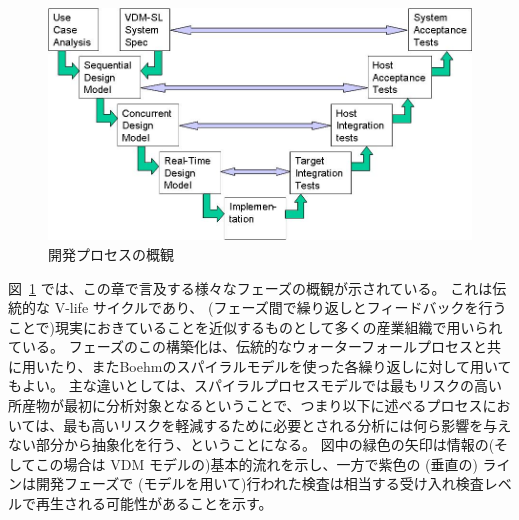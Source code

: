 \documentclass[\pformat,12pt]{jreport}
\begin{document}
\begin{figure}
\begin{center}
\includegraphics[width=\textwidth]{lifecycle}
\end{center}






\caption{開発プロセスの概観}\label{fig:processoverview}
\end{figure}

図~\ref{fig:processoverview} では、この章で言及する様々なフェーズの概観が示されている。
これは伝統的な V-life サイクルであり、 (フェーズ間で繰り返しとフィードバックを行うことで)現実におきていることを近似するものとして多くの産業組織で用いられている。
フェーズのこの構築化は、伝統的なウォーターフォールプロセスと共に用いたり、またBoehmのスパイラルモデル\cite{Sommerville82, Boehm88}を使った各繰り返しに対して用いてもよい。
主な違いとしては、スパイラルプロセスモデルでは最もリスクの高い所産物が最初に分析対象となるということで、つまり以下に述べるプロセスにおいては、最も高いリスクを軽減するために必要とされる分析には何ら影響を与えない部分から抽象化を行う、ということになる。
図中の緑色の矢印は情報の(そしてこの場合は VDM モデルの)基本的流れを示し、一方で紫色の (垂直の) ラインは開発フェーズで (モデルを用いて)行われた検査は相当する受け入れ検査レベルで再生される可能性があることを示す。
\end{document}

